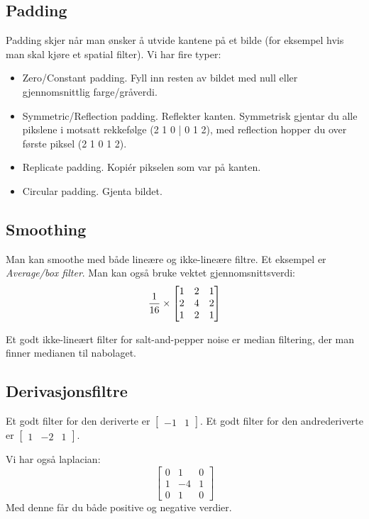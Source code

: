 \subsection{Padding}
Padding skjer når man ønsker å utvide kantene på et bilde (for eksempel hvis man skal kjøre et spatial filter). Vi har fire typer:
    \begin{itemize}
        \item Zero/Constant padding. Fyll inn resten av bildet med null eller gjennomsnittlig farge/gråverdi.
        \item Symmetric/Reflection padding. Reflekter kanten. Symmetrisk gjentar du alle pikslene i motsatt rekkefølge (2 1 0 | 0 1 2), med reflection hopper du over første piksel (2 1 0 1 2).
        \item Replicate padding. Kopiér pikselen som var på kanten.
        \item Circular padding. Gjenta bildet.
    \end{itemize}
    
\subsection{Smoothing}
Man kan smoothe med både lineære og ikke-lineære filtre. Et eksempel er \emph{Average/box filter}. Man kan også bruke vektet gjennomsnittsverdi:
\begin{equation}
    {1 \over 16} \times \begin{bmatrix}
        1 & 2 & 1 \\
        2 & 4 & 2 \\
        1 & 2 & 1
    \end{bmatrix}
\end{equation}

Et godt ikke-lineært filter for salt-and-pepper noise er median filtering, der man finner medianen til nabolaget.

\subsection{Derivasjonsfiltre}
Et godt filter for den deriverte er $\begin{bmatrix} -1 & 1 \end{bmatrix}$. Et godt filter for den andrederiverte er $\begin{bmatrix} 1 & -2 & 1 \end{bmatrix}$.

Vi har også laplacian:
\begin{equation}
    \begin{bmatrix}
        0 & 1 & 0 \\
        1 & -4 & 1 \\
        0 & 1 & 0
    \end{bmatrix}
\end{equation}
Med denne får du både positive og negative verdier.

